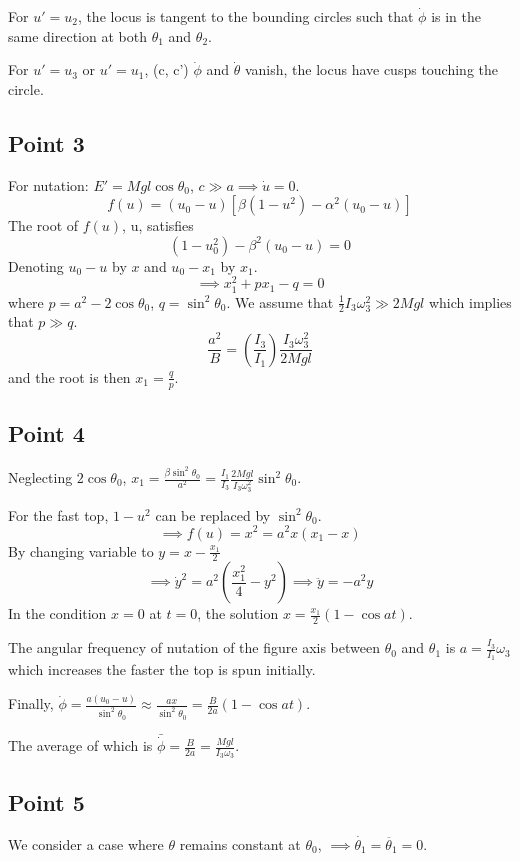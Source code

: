 \documentclass[12pt]{article}
\begin{document}
	For $u'=u_2$, the locus is tangent to the bounding circles such that $\dot{\phi}$ is in the same direction at both $\theta_1$ and $\theta_2$.
	
	For $u'=u_3$ or $u'=u_1$, (c, c') $\dot{\phi}$ and $\dot{\theta}$ vanish, the locus have cusps touching the circle.
	
	\subsection*{Point 3}
	For nutation: $E' = Mgl\cos\theta_0$, $c \gg a \implies \dot{u}=0$.
	$$ f(u) = (u_0-u)[\beta(1-u^2) - \alpha^2(u_0-u)] $$
	The root of $f(u)$, u, satisfies
	$$ (1-u_0^2) - \beta^2(u_0-u) = 0 $$
	Denoting $u_0-u$ by $x$ and $u_0 - x_1$ by $x_1$.
	$$ \implies x_1^2 + px_1 - q = 0 $$
	where $p = a^2 - 2\cos\theta_0$, $q = \sin^2\theta_0$.
	We assume that $\frac{1}{2}I_3\omega_3^2 \gg 2Mgl$ which implies that $p \gg q$.
	$$ \frac{a^2}{B} = \left(\frac{I_3}{I_1}\right) \frac{I_3\omega_3^2}{2Mgl} $$
	and the root is then $x_1 = \frac{q}{p}$.
	
	\subsection*{Point 4}
	Neglecting $2\cos\theta_0$, $x_1 = \frac{\beta\sin^2\theta_0}{a^2} = \frac{I_1}{I_3} \frac{2Mgl}{I_3\omega_3^2}\sin^2\theta_0$.
	
	For the fast top, $1-u^2$ can be replaced by $\sin^2\theta_0$.
	$$ \implies f(u) = x^2 = a^2x(x_1-x) $$
	By changing variable to $y = x-\frac{x_1}{2}$
	$$ \implies \dot{y}^2 = a^2(\frac{x_1^2}{4}-y^2) \implies \ddot{y} = -a^2y $$
	In the condition $x=0$ at $t=0$, the solution $x=\frac{x_1}{2}(1-\cos at)$.
	
	The angular frequency of nutation of the figure axis between $\theta_0$ and $\theta_1$ is $a = \frac{I_3}{I_1}\omega_3$ which increases the faster the top is spun initially.
	
	Finally, $\dot{\phi} = \frac{a(u_0-u)}{\sin^2\theta_0} \approx \frac{ax}{\sin^2\theta_0} = \frac{B}{2a}(1-\cos at)$.
	
	The average of which is $\bar{\dot{\phi}} = \frac{B}{2a} = \frac{Mgl}{I_3\omega_3}$.
	
	\subsection*{Point 5}
	We consider a case where $\theta$ remains constant at $\theta_0$, $\implies \dot{\theta_1}=\ddot{\theta_1}=0$. 
	
\end{document}
